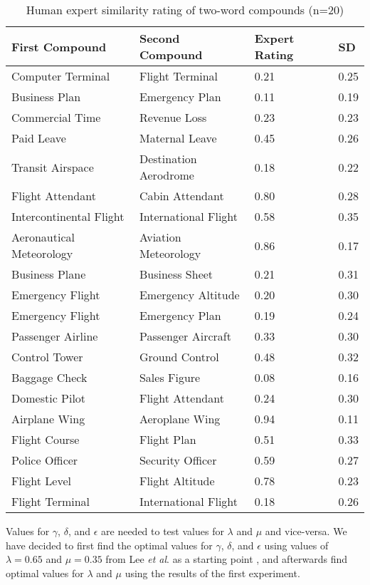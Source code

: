 \documentclass{article}
\begin{document}
\begin{table}[h!]
\caption{Human expert similarity rating of two-word compounds (n=20)}
\centering
\begin{tabular}{llll}
	\toprule
	First Compound & Second Compound & Expert Rating & SD \\
	\midrule
	Computer Terminal & Flight Terminal & 0.21 & 0.25 \\
	Business Plan & Emergency Plan & 0.11 & 0.19\\
	Commercial Time & Revenue Loss & 0.23 & 0.23 \\
	Paid Leave & Maternal Leave & 0.45 & 0.26  \\
	Transit Airspace & Destination Aerodrome & 0.18 & 0.22 \\
	Flight Attendant & Cabin Attendant & 0.80 & 0.28 \\
	Intercontinental Flight & International Flight & 0.58 & 0.35 \\
	Aeronautical Meteorology & Aviation Meteorology & 0.86 & 0.17 \\
	Business Plane & Business Sheet & 0.21 & 0.31 \\
	Emergency Flight & Emergency Altitude & 0.20 & 0.30 \\
	Emergency Flight & Emergency Plan & 0.19 & 0.24 \\
	Passenger Airline & Passenger Aircraft & 0.33 & 0.30 \\
	Control Tower & Ground Control & 0.48 & 0.32 \\
	Baggage Check & Sales Figure & 0.08 & 0.16 \\
	Domestic Pilot & Flight Attendant & 0.24 & 0.30 \\
	Airplane Wing & Aeroplane Wing & 0.94 & 0.11 \\
	Flight Course & Flight Plan & 0.51 & 0.33 \\
	Police Officer & Security Officer & 0.59 & 0.27 \\
	Flight Level & Flight Altitude & 0.78 & 0.23 \\
	Flight Terminal & International Flight & 0.18 & 0.26 \\
	\bottomrule
\end{tabular}
\label{table:humancompoundsimilarity}
\end{table}

Values for $\gamma$, $\delta$, and $\epsilon$ are needed to test values for $\lambda$ and $\mu$ and vice-versa. We have decided to first find the optimal values for $\gamma$, $\delta$, and $\epsilon$ using values of $\lambda = 0.65$ and $\mu = 0.35$ from Lee \emph{et al}. as a starting point \cite{lee2016combining}, and afterwards find optimal values for $\lambda$ and $\mu$ using the results of the first experiment.
\end{document}
